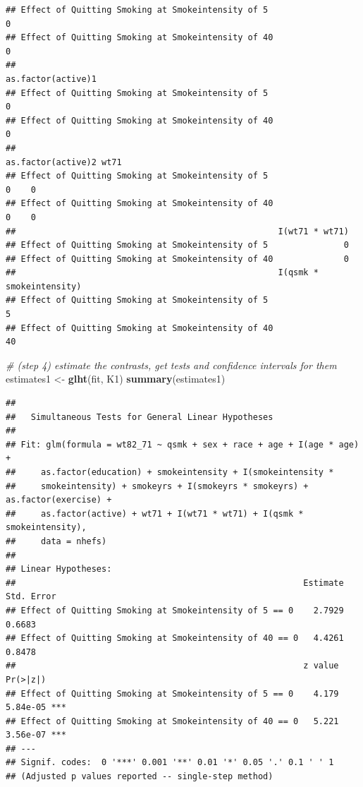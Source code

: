 \documentclass[
  10pt,
]{book}
\newenvironment{Shaded}{\begin{snugshade}}{\end{snugshade}}
\newcommand{\CommentTok}[1]{\textcolor[rgb]{0.56,0.35,0.01}{\textit{#1}}}
\newcommand{\KeywordTok}[1]{\textcolor[rgb]{0.13,0.29,0.53}{\textbf{#1}}}
\newcommand{\NormalTok}[1]{#1}
\newcommand{\StringTok}[1]{\textcolor[rgb]{0.31,0.60,0.02}{#1}}
\begin{document}
\begin{verbatim}
## Effect of Quitting Smoking at Smokeintensity of 5                     0
## Effect of Quitting Smoking at Smokeintensity of 40                    0
##                                                    as.factor(active)1
## Effect of Quitting Smoking at Smokeintensity of 5                   0
## Effect of Quitting Smoking at Smokeintensity of 40                  0
##                                                    as.factor(active)2 wt71
## Effect of Quitting Smoking at Smokeintensity of 5                   0    0
## Effect of Quitting Smoking at Smokeintensity of 40                  0    0
##                                                    I(wt71 * wt71)
## Effect of Quitting Smoking at Smokeintensity of 5               0
## Effect of Quitting Smoking at Smokeintensity of 40              0
##                                                    I(qsmk * smokeintensity)
## Effect of Quitting Smoking at Smokeintensity of 5                         5
## Effect of Quitting Smoking at Smokeintensity of 40                       40
\end{verbatim}

\begin{Shaded}
\begin{Highlighting}[]
\CommentTok{# (step 4) estimate the contrasts, get tests and confidence intervals for them}
\NormalTok{estimates1 <-}\StringTok{ }\KeywordTok{glht}\NormalTok{(fit, K1)}
  \KeywordTok{summary}\NormalTok{(estimates1)}
\end{Highlighting}
\end{Shaded}

\begin{verbatim}
## 
## 	 Simultaneous Tests for General Linear Hypotheses
## 
## Fit: glm(formula = wt82_71 ~ qsmk + sex + race + age + I(age * age) + 
##     as.factor(education) + smokeintensity + I(smokeintensity * 
##     smokeintensity) + smokeyrs + I(smokeyrs * smokeyrs) + as.factor(exercise) + 
##     as.factor(active) + wt71 + I(wt71 * wt71) + I(qsmk * smokeintensity), 
##     data = nhefs)
## 
## Linear Hypotheses:
##                                                         Estimate Std. Error
## Effect of Quitting Smoking at Smokeintensity of 5 == 0    2.7929     0.6683
## Effect of Quitting Smoking at Smokeintensity of 40 == 0   4.4261     0.8478
##                                                         z value Pr(>|z|)    
## Effect of Quitting Smoking at Smokeintensity of 5 == 0    4.179 5.84e-05 ***
## Effect of Quitting Smoking at Smokeintensity of 40 == 0   5.221 3.56e-07 ***
## ---
## Signif. codes:  0 '***' 0.001 '**' 0.01 '*' 0.05 '.' 0.1 ' ' 1
## (Adjusted p values reported -- single-step method)
\end{verbatim}
\end{document}
